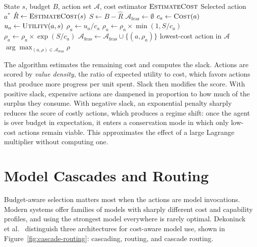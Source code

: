 \documentclass[11pt]{book}
\begin{document}
\begin{algorithm}
\caption{Slack-Adjusted Action Selection}
\begin{algorithmic}[1]
\Require State $s$, budget $B$, action set $\mathcal{A}$, cost estimator $\textsc{EstimateCost}$
\Ensure Selected action $a^*$
\State $\hat{R} \gets \textsc{EstimateCost}(s)$
\State $S \gets B - \hat{R}$
\State $\mathcal{A}_{\text{feas}} \gets \emptyset$
    \State $c_a \gets \textsc{Cost}(a)$
    \State $u_a \gets \textsc{Utility}(a, s)$
        \State $\rho_a \gets u_a / c_a$ 
            \State $\rho_a \gets \rho_a \times \min(1, S / c_a)$
        \Else
            \State $\rho_a \gets \rho_a \times \exp(S / c_a)$
        \EndIf
        \State $\mathcal{A}_{\text{feas}} \gets \mathcal{A}_{\text{feas}} \cup \{(a, \rho_a)\}$
    \EndIf
\EndFor
{}
    \State \Return lowest-cost action in $\mathcal{A}$
\EndIf
\State \Return $\arg\max_{(a, \rho) \in \mathcal{A}_{\text{feas}}} \rho$
\end{algorithmic}
\end{algorithm}

The algorithm estimates the remaining cost and computes the slack. Actions are scored by \emph{value density}, the ratio of expected utility to cost, which favors actions that produce more progress per unit spent. Slack then modifies the score. With positive slack, expensive actions are dampened in proportion to how much of the surplus they consume. With negative slack, an exponential penalty sharply reduces the score of costly actions, which produces a regime shift: once the agent is over budget in expectation, it enters a conservation mode in which only low-cost actions remain viable. This approximates the effect of a large Lagrange multiplier without computing one.

\section{Model Cascades and Routing}

Budget-aware selection matters most when the actions are model invocations. Modern systems offer families of models with sharply different cost and capability profiles, and using the strongest model everywhere is rarely optimal. Dekoninck et al.\ \cite{dekoninck2025cascade} distinguish three architectures for cost-aware model use, shown in Figure~\ref{fig:cascade-routing}: cascading, routing, and cascade routing.
\end{document}
